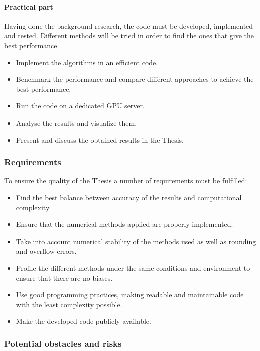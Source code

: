 \paragraph{Practical part}

Having done the background research, the code must be developed, implemented and
tested.  Different methods will be tried in order to find the ones that give the
best performance.

\begin{itemize}
    \item Implement the algorithms in an efficient code.
    \item Benchmark the performance and compare different approaches to achieve the best performance.
    \item Run the code on a dedicated GPU server.
    \item Analyse the results and visualize them.
    \item Present and discuss the obtained results in the Thesis.
\end{itemize}

\subsubsection{Requirements}

To ensure the quality of the Thesis a number of requirements must be fulfilled:
\begin{itemize}
    \item Find the best balance between accuracy of the results and computational complexity
    \item Ensure that the numerical methods applied are properly implemented.
    \item Take into account numerical stability of the methods used as well as rounding and overflow errors.
    \item Profile the different methods under the same conditions and environment to ensure that there are no biases.
    \item Use good programming practices, making readable and maintainable code with the least complexity possible.
    \item Make the developed code publicly available.
\end{itemize}

\subsubsection{Potential obstacles and risks}%
\label{ssub:intro_risks}

